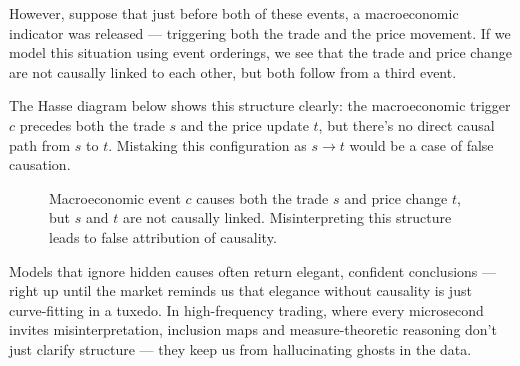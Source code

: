 However, suppose that just before both of these events, a macroeconomic indicator was released — triggering both the trade and the price movement. If we model this situation using event orderings, we see that the trade and price change are not causally linked to each other, but both follow from a third event.

The Hasse diagram below shows this structure clearly: the macroeconomic trigger \( c \) precedes both the trade \( s \) and the price update \( t \), but there's no direct causal path from \( s \) to \( t \). Mistaking this configuration as \( s \rightarrow t \) would be a case of false causation.


\begin{figure}[H]
\centering
{}
\caption{Macroeconomic event \( c \) causes both the trade \( s \) and price change \( t \), but \( s \) and \( t \) are not causally linked. Misinterpreting this structure leads to false attribution of causality.}
\end{figure}


\vspace{1em}
\noindent
Models that ignore hidden causes often return elegant, confident conclusions — right up until the market reminds us that elegance without causality is just curve-fitting in a tuxedo. In high-frequency trading, where every microsecond invites misinterpretation, inclusion maps and measure-theoretic reasoning don’t just clarify structure — they keep us from hallucinating ghosts in the data.



